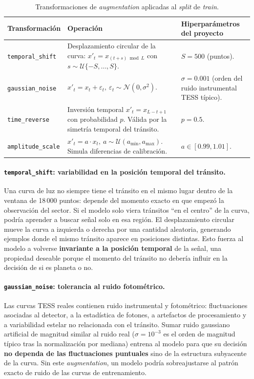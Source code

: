 \documentclass[11pt,a4paper]{article}
\begin{document}
\begin{table}[H]
\centering
\caption{Transformaciones de \textit{augmentation} aplicadas al
\textit{split} de \textit{train}.}
\label{tab:augmentation}
\renewcommand{\arraystretch}{1.25}
\begin{tabular}{p{} p{} p{}}
\toprule
\textbf{Transformación} & \textbf{Operación} & \textbf{Hiperparámetros del proyecto} \\
\midrule
\texttt{temporal\_shift} &
  Desplazamiento circular de la curva: $x'_t = x_{(t + s) \bmod L}$
  con $s \sim \mathcal{U}\{-S, \dots, S\}$. &
  $S = 500$ (puntos). \\
\addlinespace
\texttt{gaussian\_noise} &
  $x'_t = x_t + \varepsilon_t,\ \varepsilon_t \sim \mathcal{N}(0, \sigma^2)$. &
  $\sigma = 0.001$ (orden del ruido instrumental TESS típico). \\
\addlinespace
\texttt{time\_reverse} &
  Inversión temporal $x'_t = x_{L-t+1}$ con probabilidad $p$.
  Válida por la simetría temporal del tránsito. &
  $p = 0.5$. \\
\addlinespace
\texttt{amplitude\_scale} &
  $x'_t = a \cdot x_t,\ a \sim \mathcal{U}(a_{\min}, a_{\max})$.
  Simula diferencias de calibración. &
  $a \in [0.99, 1.01]$. \\
\bottomrule
\end{tabular}
\end{table}

\paragraph{\texttt{temporal\_shift}: variabilidad en la posición temporal del tránsito.}
Una curva de luz no siempre tiene el tránsito en el mismo lugar dentro
de la ventana de 18\,000 puntos: depende del momento exacto en que
empezó la observación del sector. Si el modelo solo viera tránsitos
``en el centro'' de la curva, podría aprender a buscar señal solo en
esa región. El desplazamiento circular mueve la curva a izquierda o
derecha por una cantidad aleatoria, generando ejemplos donde el mismo
tránsito aparece en posiciones distintas. Esto fuerza al modelo a
volverse \textbf{invariante a la posición temporal} de la señal, una
propiedad deseable porque el momento del tránsito no debería influir
en la decisión de si es planeta o no.

\paragraph{\texttt{gaussian\_noise}: tolerancia al ruido fotométrico.}
Las curvas TESS reales contienen ruido instrumental y fotométrico:
fluctuaciones asociadas al detector, a la estadística de fotones, a
artefactos de procesamiento y a variabilidad estelar no relacionada
con el tránsito. Sumar ruido gaussiano artificial de magnitud
similar al ruido real ($\sigma = 10^{-3}$ es el orden de magnitud
típico tras la normalización por mediana) entrena al modelo para que
su decisión \textbf{no dependa de las fluctuaciones puntuales} sino
de la estructura subyacente de la curva. Sin este
\textit{augmentation}, un modelo podría sobreajustarse al patrón
exacto de ruido de las curvas de entrenamiento.
\end{document}
